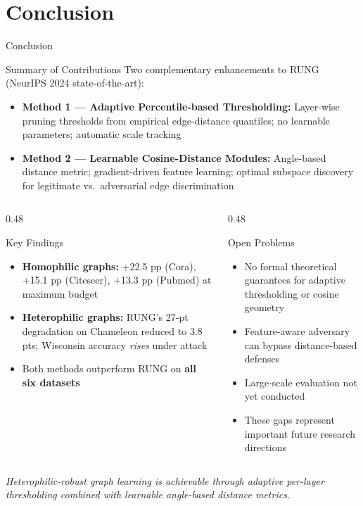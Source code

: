 \documentclass[aspectratio=169]{beamer}
\begin{document}
\section{Conclusion}

\begin{frame}{Conclusion}
  \tiny
  \begin{block}{Summary of Contributions}
    Two complementary enhancements to RUNG (NeurIPS 2024 state-of-the-art):
    \begin{itemize}
      \item \textbf{Method 1 --- Adaptive Percentile-based Thresholding:} Layer-wise pruning thresholds from empirical edge-distance quantiles; no learnable parameters; automatic scale tracking
      \item \textbf{Method 2 --- Learnable Cosine-Distance Modules:} Angle-based distance metric; gradient-driven feature learning; optimal subspace discovery for legitimate vs.\ adversarial edge discrimination
    \end{itemize}
  \end{block}
  \vspace{4pt}
  \begin{columns}[T]
    \begin{column}{0.48\textwidth}
      \begin{block}{Key Findings}
        \begin{itemize}
          \item \textbf{Homophilic graphs:} +22.5 pp (Cora), +15.1 pp (Citeseer), +13.3 pp (Pubmed) at maximum budget
          \item \textbf{Heterophilic graphs:} RUNG's 27-pt degradation on Chameleon reduced to 3.8 pts; Wisconsin accuracy \emph{rises} under attack
          \item Both methods outperform RUNG on \textbf{all six datasets}
        \end{itemize}
      \end{block}
    \end{column}
    \begin{column}{0.48\textwidth}
      \begin{alertblock}{Open Problems}
        \begin{itemize}
          \item No formal theoretical guarantees for adaptive thresholding or cosine geometry
          \item Feature-aware adversary can bypass distance-based defenses
          \item Large-scale evaluation not yet conducted
          \item These gaps represent important future research directions
        \end{itemize}
      \end{alertblock}
    \end{column}
  \end{columns}
  \vspace{6pt}
  \centering
  \textit{Heterophilic-robust graph learning is achievable through adaptive per-layer thresholding combined with learnable angle-based distance metrics.}
\end{frame}
\end{document}
